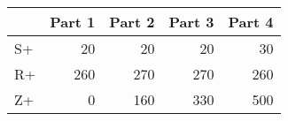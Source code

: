 \begin{tabular}{lrrrr}
\toprule
 & Part 1 & Part 2 & Part 3 & Part 4 \\
\midrule
S+ & 20 & 20 & 20 & 30 \\
R+ & 260 & 270 & 270 & 260 \\
Z+ & 0 & 160 & 330 & 500 \\
\bottomrule
\end{tabular}

